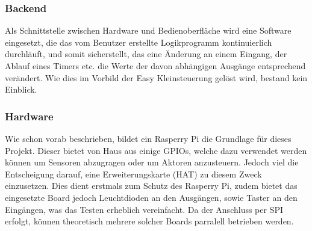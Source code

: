 \subsubsection{Backend} 
Als Schnittstelle zwischen Hardware und Bedienoberfläche wird eine Software eingesetzt, die das vom Benutzer erstellte Logikprogramm kontinuierlich durchläuft, und somit sicherstellt, das eine Änderung an einem Eingang, der Ablauf eines Timers etc. die Werte der davon abhängigen Ausgänge entsprechend verändert. Wie dies im Vorbild der Easy Kleinsteuerung gelöst wird, bestand kein Einblick.  

\subsubsection{Hardware} 
Wie schon vorab beschrieben, bildet ein Rasperry Pi die Grundlage für dieses Projekt. Dieser bietet von Haus aus einige GPIOs, welche  dazu  verwendet werden können um Sensoren abzugragen oder um Aktoren anzusteuern. Jedoch viel die Entscheigung darauf, eine Erweiterungskarte (HAT) zu diesem Zweck einzusetzen. Dies dient erstmals zum Schutz des Rasperry Pi, zudem bietet das eingesetzte Board jedoch Leuchtdioden an den Ausgängen, sowie Taster an den Eingängen, was das Testen erheblich vereinfacht. Da der Anschluss per SPI erfolgt, können theoretisch mehrere solcher Boards parralell betrieben werden. 


